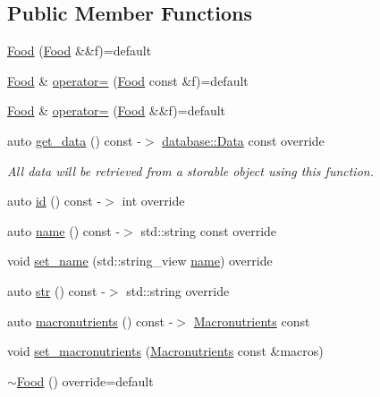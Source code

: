 \subsection*{Public Member Functions}
\begin{DoxyCompactItemize}
\item 
\hyperlink{classfood_1_1_food_ad3ba5861593fb753085ba502ca5d844a}{Food} (\hyperlink{classfood_1_1_food}{Food} \&\&f)=default
\item 
\hyperlink{classfood_1_1_food}{Food} \& \hyperlink{classfood_1_1_food_ae0ef42fe8425b35b39b1ea88e2dea27a}{operator=} (\hyperlink{classfood_1_1_food}{Food} const \&f)=default
\item 
\hyperlink{classfood_1_1_food}{Food} \& \hyperlink{classfood_1_1_food_a76b0691a40c6b412e04001af5a9af8e3}{operator=} (\hyperlink{classfood_1_1_food}{Food} \&\&f)=default
\item 
auto \hyperlink{classfood_1_1_food_ac3aefc08b78fa521b4317348463e5a5f}{get\+\_\+data} () const -\/$>$ \hyperlink{structdatabase_1_1_data}{database\+::\+Data} const override
\begin{DoxyCompactList}\small\item\em All data will be retrieved from a storable object using this function. \end{DoxyCompactList}\item 
auto \hyperlink{classfood_1_1_food_a76d21be86ff4500225e593205fc305c5}{id} () const -\/$>$ int override
\item 
auto \hyperlink{classfood_1_1_food_a29ccb0bdf6b74e6073b87bc71c70df04}{name} () const -\/$>$ std\+::string const override
\item 
void \hyperlink{classfood_1_1_food_ac717bda45254fd555b4de00004423041}{set\+\_\+name} (std\+::string\+\_\+view \hyperlink{classfood_1_1_food_a29ccb0bdf6b74e6073b87bc71c70df04}{name}) override
\item 
auto \hyperlink{classfood_1_1_food_a2ac3b444a1ef09dbcec63370f2c8f554}{str} () const -\/$>$ std\+::string override
\item 
auto \hyperlink{classfood_1_1_food_abea955fedfefd84254d7b788451a2a61}{macronutrients} () const -\/$>$ \hyperlink{classfood_1_1_macronutrients}{Macronutrients} const
\item 
void \hyperlink{classfood_1_1_food_a0df55be446b9dae80026bec62b2c1c5c}{set\+\_\+macronutrients} (\hyperlink{classfood_1_1_macronutrients}{Macronutrients} const \&macros)
\item 
\hyperlink{classfood_1_1_food_a065b75e0736ec60104419b9076db67c5}{$\sim$\+Food} () override=default
\end{DoxyCompactItemize}
